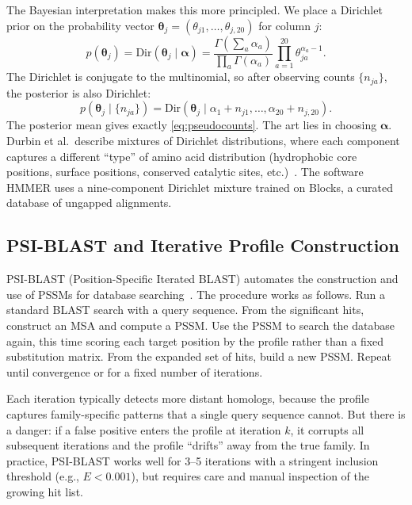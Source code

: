 The Bayesian interpretation makes this more principled.
We place a Dirichlet prior on the probability vector $\bm{\theta}_j = (\theta_{j1}, \ldots, \theta_{j,20})$ for column $j$:
\begin{equation}
\label{eq:dirichlet-prior}
  p(\bm{\theta}_j) = \text{Dir}(\bm{\theta}_j \mid \bm{\alpha}) = \frac{\Gamma(\sum_a \alpha_a)}{\prod_a \Gamma(\alpha_a)} \prod_{a=1}^{20} \theta_{ja}^{\alpha_a - 1}.
\end{equation}
The Dirichlet is conjugate to the multinomial, so after observing counts $\{n_{ja}\}$, the posterior is also Dirichlet:
\begin{equation}
\label{eq:dirichlet-posterior}
  p(\bm{\theta}_j \mid \{n_{ja}\}) = \text{Dir}(\bm{\theta}_j \mid \alpha_1 + n_{j1}, \ldots, \alpha_{20} + n_{j,20}).
\end{equation}
The posterior mean gives exactly \cref{eq:pseudocounts}.
The art lies in choosing $\bm{\alpha}$.
Durbin et al.\ describe mixtures of Dirichlet distributions, where each component captures a different ``type'' of amino acid distribution (hydrophobic core positions, surface positions, conserved catalytic sites, etc.)~\cite{durbin1998}.
The software HMMER uses a nine-component Dirichlet mixture trained on Blocks, a curated database of ungapped alignments.

\subsection{PSI-BLAST and Iterative Profile Construction}
\label{sec:psi-blast}

PSI-BLAST (Position-Specific Iterated BLAST) automates the construction and use of PSSMs for database searching~\cite{altschul1997}.
The procedure works as follows.
Run a standard BLAST search with a query sequence.
From the significant hits, construct an MSA and compute a PSSM.
Use the PSSM to search the database again, this time scoring each target position by the profile rather than a fixed substitution matrix.
From the expanded set of hits, build a new PSSM.
Repeat until convergence or for a fixed number of iterations.

Each iteration typically detects more distant homologs, because the profile captures family-specific patterns that a single query sequence cannot.
But there is a danger: if a false positive enters the profile at iteration $k$, it corrupts all subsequent iterations and the profile ``drifts'' away from the true family.
In practice, PSI-BLAST works well for 3--5 iterations with a stringent inclusion threshold (e.g., $E < 0.001$), but requires care and manual inspection of the growing hit list.



